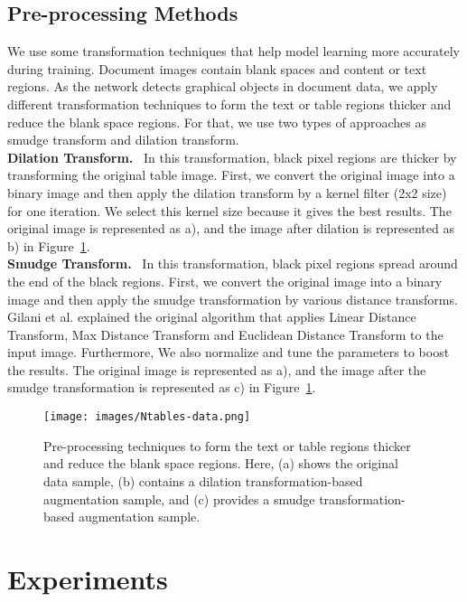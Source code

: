 \documentclass[sn-mathphys]{sn-jnl}\jyear{2021}\theoremstyle{thmstyleone}\newtheorem{theorem}{Theorem}\newtheorem{proposition}[theorem]{Proposition}\theoremstyle{thmstyletwo}\newtheorem{example}{Example}\newtheorem{remark}{Remark}\theoremstyle{thmstylethree}\newtheorem{definition}{Definition}\usepackage{amsmath}
\begin{document}
\subsection{Pre-processing Methods}
 We use some transformation techniques that help model learning more accurately during training. Document images contain blank spaces and content or text regions. As the network detects graphical objects in document data, we apply different transformation techniques to form the text or table regions thicker and reduce the blank space regions. For that, we use two types of approaches as smudge transform and dilation transform.\\

\noindent\textbf{Dilation Transform.}~
In this transformation, black pixel regions are thicker by transforming the original table image. First, we convert the original image into a binary image and then apply the dilation transform by a kernel filter (2x2 size) for one iteration. We select this kernel size because it gives the best results. The original image is represented as a), and the image after dilation is represented as b) in Figure~\ref{fig:trans}. \\

\noindent\textbf{Smudge Transform.}~
In this transformation, black pixel regions spread around the end of the black regions. First, we convert the original image into a binary image and then apply the smudge transformation by various distance transforms. Gilani et al. \cite{Azka62} explained the original algorithm that applies Linear Distance Transform, Max Distance Transform and Euclidean Distance Transform to the input image. Furthermore, We also normalize and tune the parameters to boost the results. The original image is represented as a), and the image after the smudge transformation is represented as c) in Figure~\ref{fig:trans}. 
\begin{figure}
\centering
\texttt{[image: images/Ntables-data.png]}
\caption{Pre-processing techniques to
form the text or table regions thicker and reduce the blank space regions. Here, (a) shows the original data sample, (b) contains a dilation transformation-based augmentation sample, and (c) provides a smudge transformation-based augmentation sample.}\label{fig:trans}
\end{figure}

\section{Experiments }
\label{sec:experiments_results}
\end{document}
